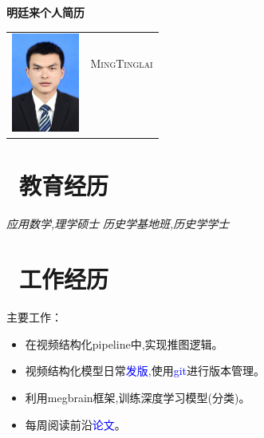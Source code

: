 \documentclass{resume}
\begin{document}
\begin{center} 
\Large\textbf{明廷来个人简历}
\end{center}

{
\Large{
  \begin{tabu}{ c l }
    & \scshape{MingTinglai} \\ 
    & \\ 
    & \\
    & 
  \end{tabu}
}
}

\section{\textcolor{blue}\faGraduationCap\ 教育经历}
\textit{应用数学,理学硕士}
\textit{历史学基地班,历史学学士} 

\section{\textcolor{blue}\faUsers\ 工作经历}
主要工作：
\begin{itemize}
  \item 在视频结构化pipeline中,实现推图逻辑。
  \item 视频结构化模型日常\textcolor{blue}{发版},使用\textcolor{blue}{git}进行版本管理。
  \item 利用megbrain框架,训练深度学习模型(分类)。%
  \item 每周阅读前沿\textcolor{blue}{论文}。
\end{itemize}
\end{document}

